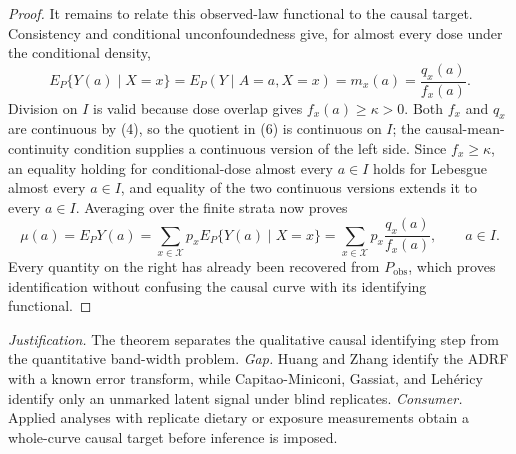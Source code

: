 \documentclass{article}
\begin{document}
\begin{proof}
It remains to relate this observed-law functional to the causal target.  Consistency and conditional unconfoundedness give, for almost every dose under the conditional density,
\[
E_P\{Y(a)\mid X=x\}
=E_P(Y\mid A=a,X=x)
=m_x(a)=\frac{q_x(a)}{f_x(a)}. \tag{6}
\]
Division on \(I\) is valid because dose overlap gives \(f_x(a)\ge\kappa>0\).  Both \(f_x\) and \(q_x\) are continuous by (4), so the quotient in (6) is continuous on \(I\); the causal-mean-continuity condition supplies a continuous version of the left side.  Since \(f_x\ge\kappa\), an equality holding for conditional-dose almost every \(a\in I\) holds for Lebesgue almost every \(a\in I\), and equality of the two continuous versions extends it to every \(a\in I\).  Averaging over the finite strata now proves
\[
\mu(a)=E_PY(a)
=\sum_{x\in\mathcal X}p_xE_P\{Y(a)\mid X=x\}
=\sum_{x\in\mathcal X}p_x\frac{q_x(a)}{f_x(a)},
\qquad a\in I.
\]
Every quantity on the right has already been recovered from \(P_{\mathrm{obs}}\), which proves identification without confusing the causal curve with its identifying functional.
\end{proof}
\par\smallskip\noindent \textit{Justification.} The theorem separates the qualitative causal identifying step from the quantitative band-width problem. \textit{Gap.} Huang and Zhang identify the ADRF with a known error transform, while Capitao-Miniconi, Gassiat, and Lehéricy identify only an unmarked latent signal under blind replicates. \textit{Consumer.} Applied analyses with replicate dietary or exposure measurements obtain a whole-curve causal target before inference is imposed.
\end{document}
